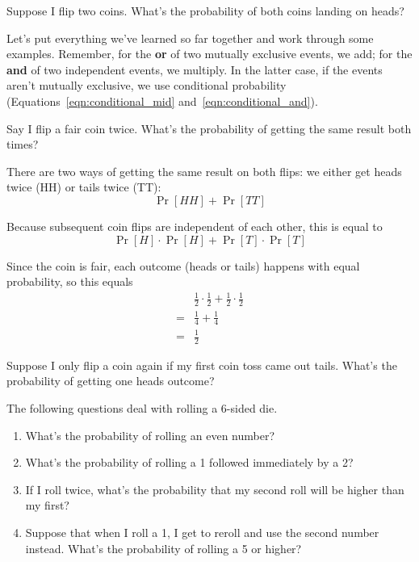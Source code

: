 \begin{exercise}
    Suppose I flip two coins. What's the probability of both coins landing on heads?
\end{exercise}

Let's put everything we've learned so far together and work through some examples. 
Remember, for the \textbf{or} of two mutually exclusive events, we add; 
for the \textbf{and} of two independent events, we multiply. In the latter 
case, if the events aren't mutually exclusive, we use conditional probability 
(Equations~\ref{eqn:conditional_mid} and~\ref{eqn:conditional_and}).

\begin{example}
    Say I flip a fair coin twice. What's the probability of getting the 
    same result both times?

    There are two ways of getting the same result on both flips: we either 
    get heads twice (HH) or tails twice (TT):
    \[
        \Pr[HH] + \Pr[TT]
    \]

    Because subsequent coin flips are independent of each other, this is equal to 
    \[
        \Pr[H]\cdot \Pr[H] + \Pr[T]\cdot\Pr[T]
    \]

    Since the coin is fair, each outcome (heads or tails) happens with equal 
    probability, so this equals
    \begin{align*}
        & \frac{1}{2}\cdot\frac{1}{2} + 
        \frac{1}{2}\cdot\frac{1}{2}\\
        =& \frac{1}{4} + \frac{1}{4}\\
        =& \frac{1}{2}
    \end{align*}
\end{example}

\begin{exercise}
    Suppose I only flip a coin again if my first coin toss came out tails. 
    What's the probability of getting one heads outcome?
\end{exercise}

\begin{exercise} The following questions deal with rolling a 6-sided die.
    \renewcommand{\labelenumi}{(\alph{enumi})} 
    \begin{enumerate}
        \item What's the probability of rolling an even number?
        \item What's the probability of rolling a 1 followed immediately by a 2?
        \item If I roll twice, what's the probability that my second roll will 
        be higher than my first?
        \item Suppose that when I roll a 1, I get to reroll and use the 
        second number instead. What's the probability of rolling a 5 or higher?
    \end{enumerate}
\end{exercise}

